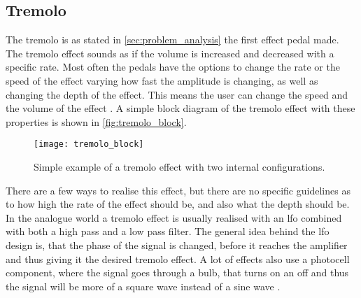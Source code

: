 \subsection{Tremolo}

The tremolo is as stated in \autoref{sec:problem_analysis} the first effect pedal made. The tremolo effect sounds as if the volume is increased and decreased with a specific rate. Most often the pedals have the options to change the rate or the speed of the effect varying how fast the amplitude is changing, as well as changing the depth of the effect. This means the user can change the speed and the volume of the effect \citep{tremolo_descr}. A simple block diagram of the tremolo effect with these properties is shown in \autoref{fig:tremolo_block}.

\begin{figure}[htbp]
	\centering
	\texttt{[image: tremolo\_block]}
	\caption{Simple example of a tremolo effect with two internal configurations.}
	\label{fig:tremolo_block}
\end{figure}

There are a few ways to realise this effect, but there are no specific guidelines as to how high the rate of the effect should be, and also what the depth should be. In the analogue world a tremolo effect is usually realised with an \gls{lfo} combined with both a high pass and a low pass filter. The general idea behind the \gls{lfo} design is, that the phase of the signal is changed, before it reaches the amplifier and thus giving it the desired tremolo effect. A lot of effects also use a photocell component, where the signal goes through a bulb, that turns on an off and thus the signal will be more of a square wave instead of a sine wave \citep{tremped}.  